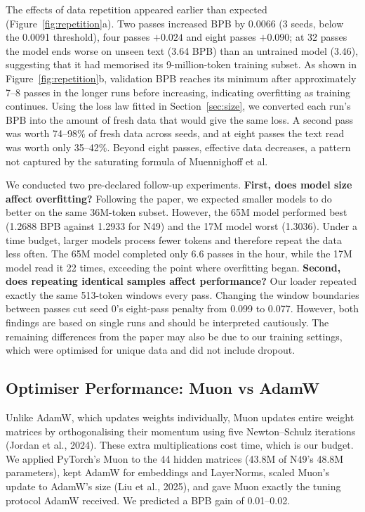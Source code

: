 \documentclass[11pt,a4paper]{article}
\begin{document}
The effects of data repetition appeared earlier than expected (Figure~\ref{fig:repetition}a). Two passes increased BPB by 0.0066 (3 seeds, below the 0.0091 threshold), four passes $+0.024$ and eight passes $+0.090$; at 32 passes the model ends worse on unseen text (3.64 BPB) than an untrained model (3.46), suggesting that it had memorised its 9-million-token training subset. As shown in Figure~\ref{fig:repetition}b, validation BPB reaches its minimum after approximately 7--8 passes in the longer runs before increasing, indicating overfitting as training continues. Using the loss law fitted in Section~\ref{sec:size}, we converted each run's BPB into the amount of fresh data that would give the same loss. A second pass was worth 74--98\% of fresh data across seeds, and at eight passes the text read was worth only 35--42\%. Beyond eight passes, effective data decreases, a pattern not captured by the saturating formula of Muennighoff et al.

We conducted two pre-declared follow-up experiments. \textbf{First, does model size affect overfitting?} Following the paper, we expected smaller models to do better on the same 36M-token subset. However, the 65M model performed best (1.2688 BPB against 1.2933 for N49) and the 17M model worst (1.3036). Under a time budget, larger models process fewer tokens and therefore repeat the data less often. The 65M model completed only 6.6 passes in the hour, while the 17M model read it 22 times, exceeding the point where overfitting began. \textbf{Second, does repeating identical samples affect performance?} Our loader repeated exactly the same 513-token windows every pass. Changing the window boundaries between passes cut seed 0's eight-pass penalty from 0.099 to 0.077. However, both findings are based on single runs and should be interpreted cautiously. The remaining differences from the paper may also be due to our training settings, which were optimised for unique data and did not include dropout.

\subsection{Optimiser Performance: Muon vs AdamW}\label{sec:muon}

Unlike AdamW, which updates weights individually, Muon updates entire weight matrices by orthogonalising their momentum using five Newton--Schulz iterations (Jordan et al., 2024). These extra multiplications cost time, which is our budget. We applied PyTorch's Muon to the 44 hidden matrices (43.8M of N49's 48.8M parameters), kept AdamW for embeddings and LayerNorms, scaled Muon's update to AdamW's size (Liu et al., 2025), and gave Muon exactly the tuning protocol AdamW received. We predicted a BPB gain of 0.01--0.02.
\end{document}

